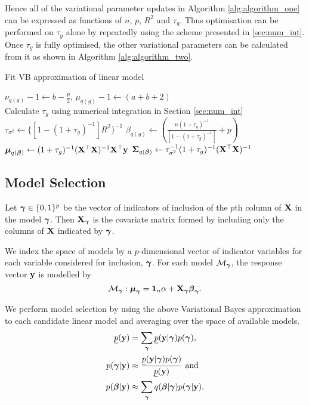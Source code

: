 \documentclass{amsart}[12pt]
\begin{document}
\noindent Hence all of the variational parameter updates in Algorithm \ref{alg:algorithm_one} can be expressed as functions
of $n$, $p$, $R^2$ and $\tau_g$. Thus optimisation can be performed on $\tau_g$ alone by repeatedly using the
scheme presented in \ref{sec:num_int}. Once $\tau_g$ is fully optimised, the other variational parameters can
be calculated from it as shown in Algorithm \ref{alg:algorithm_two}.

\begin{algorithm}
	\caption{Fit VB approximation of linear model}
	\label{alg:algorithm_two}
	\begin{algorithmic}
		\REQUIRE $\nu_{q(g)} - 1 \leftarrow b - \frac{p}{2}$, $\mu_{q(g)} - 1 \leftarrow (a + b + 2)$ \\
		\STATE Calculate $\tau_{g}$ using numerical integration in Section \ref{sec:num_int}
		\ENDWHILE
		\STATE $\tau_{\sigma^2} \leftarrow \{[1 - (1 + \tau_g)^{-1}] R^2\}^{-1}$
		\STATE $\beta_{q(g)} \leftarrow \left(\frac{n (1 + \tau_g)^{-1}}{[1 - (1 + \tau_g)^{-1}]} + p \right)$
		\STATE ${\boldsymbol \mu}_{q({\boldsymbol \beta})} \leftarrow (1 + \tau_g)^{-1} ({\bf X}^\top {\bf X})^{-1} {\bf X}^\top {\bf y}$
		\STATE ${\boldsymbol \Sigma}_{q({\boldsymbol \beta})} \leftarrow \tau_{\sigma^2}^{-1} (1 + \tau_{g})^{-1}({\bf X}^\top {\bf X})^{-1}$
	\end{algorithmic}
\end{algorithm}

\subsection{Model Selection}

Let ${\boldsymbol \gamma} \in \{0, 1\}^p$ be the vector of indicators of inclusion of the $p$th column of ${\bf X}$ in the
model ${\boldsymbol \gamma}$. Then ${\bf X}_{\boldsymbol \gamma}$ is the covariate matrix formed by including only the columns of ${\bf X}$
indicated by ${\boldsymbol \gamma}$.

We index the space of models by a $p$-dimensional vector of indicator variables for each variable considered 
for inclusion, ${\boldsymbol \gamma}$. For each model $\mathcal{M}_{\boldsymbol \gamma}$, the response vector ${\bf y}$ is modelled by
\begin{equation*}
	\mathcal{M}_{\boldsymbol \gamma}: {\boldsymbol \mu}_{\boldsymbol \gamma} = {\bf 1}_n \alpha + {\bf X}_{\boldsymbol \gamma} {\boldsymbol \beta}_{\boldsymbol \gamma}.
\end{equation*}

We perform model selection by using the above Variational Bayes approximation to each
candidate linear model and averaging over the space of available models.
\begin{align*}
	\underline{p}({\bf y}) & = \sum_{\boldsymbol \gamma} \underline{p}({\bf y}|{\boldsymbol \gamma}) p({\boldsymbol \gamma}),                                  \\
	p({\boldsymbol \gamma}|{\bf y})     & \approx \frac{\underline{p}({\bf y}|{\boldsymbol \gamma}) p({\boldsymbol \gamma})}{\underline{p}({\bf y})} \text { and } \\
	p({\boldsymbol \beta}|{\bf y})      & \approx \sum_{\boldsymbol \gamma} q({\boldsymbol \beta}|{\boldsymbol \gamma}) p({\boldsymbol \gamma}|{\bf y}).                                 \\
\end{align*}
\end{document}
